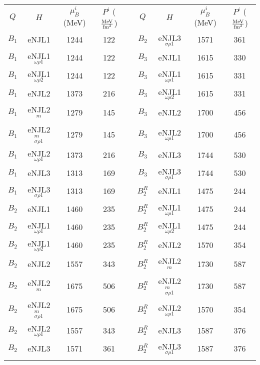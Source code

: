 \documentclass{ws-ijmpcs}
\begin{document}
\begin{table}[htb]
{\begin{tabular}{@{}ccccccccc@{}} \toprule
$Q$ & $H$ & $\mu_B^i$ (MeV) & $P^i$ ($\frac{\rm{MeV}}{\rm{fm}^3}$) && $Q$ & $H$ & $\mu_B^i$ (MeV) & $P^i$ ($\frac{\rm{MeV}}{\rm{fm}^3}$)  \\ \colrule
$B_1$ & eNJL1 & 1244 & 122                    &&   $B_2$ & eNJL3$_{\sigma\rho 1}$ & 1571 & 361    \\
$B_1$ & eNJL1$_{\omega\rho 1}$ & 1244 & 122   &&   $B_3$ & eNJL1 & 1615 & 330                 \\
$B_1$ & eNJL1$_{\omega\rho 2}$ & 1244 & 122   &&   $B_3$ & eNJL1$_{\omega\rho 1}$ & 1615 & 331    \\
$B_1$ & eNJL2 & 1373 & 216                    &&   $B_3$ & eNJL1$_{\omega\rho 2}$ & 1615 & 331    \\
$B_1$ & eNJL2$^m$ & 1279 & 145                   &&   $B_3$ & eNJL2 & 1700 & 456                 \\
$B_1$ & eNJL2$^m_{\sigma\rho 1}$ & 1279 & 145  &&   $B_3$ & eNJL2$_{\omega\rho 1}$ & 1700 & 456    \\
$B_1$ & eNJL2$_{\omega\rho 1}$ & 1373 & 216   &&   $B_3$ & eNJL3 & 1744 & 530                 \\
$B_1$ & eNJL3 & 1313 & 169                    &&   $B_3$ & eNJL3$_{\sigma\rho 1}$ & 1744 & 530    \\
$B_1$ & eNJL3$_{\sigma\rho 1}$ & 1313 & 169   &&   $B_2^R$ & eNJL1 & 1475 & 244                \\
$B_2$ & eNJL1 & 1460 & 235                    &&   $B_2^R$ & eNJL1$_{\omega\rho 1}$ & 1475 & 244   \\
$B_2$ & eNJL1$_{\omega\rho 1}$ & 1460 & 235   &&   $B_2^R$ & eNJL1$_{\omega\rho 2}$ & 1475 & 244   \\
$B_2$ & eNJL1$_{\omega\rho 2}$ & 1460 & 235   &&   $B_2^R$ & eNJL2 & 1570 & 354                \\
$B_2$ & eNJL2 & 1557 & 343                    &&   $B_2^R$ & eNJL2$^m$ & 1730 & 587               \\
$B_2$ & eNJL2$^m$ & 1675 & 506                   &&   $B_2^R$ & eNJL2$^m_{\sigma\rho 1}$ & 1730 & 587  \\
$B_2$ & eNJL2$^m_{\sigma\rho 1}$ & 1675 & 506  &&   $B_2^R$ & eNJL2$_{\omega\rho 1}$ & 1570 & 354   \\
$B_2$ & eNJL2$_{\omega\rho 1}$ & 1557 & 343   &&   $B_2^R$ & eNJL3 & 1587 & 376                \\
$B_2$ & eNJL3 & 1571 & 361                    &&   $B_2^R$ & eNJL3$_{\sigma\rho 1}$ & 1587 & 376   \\
\botrule
\end{tabular} \label{Tab:Transition_chemical_pot}}
\end{table}
\end{document}
